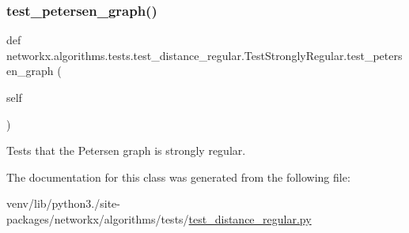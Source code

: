 \subsubsection{\texorpdfstring{test\+\_\+petersen\+\_\+graph()}{test\_petersen\_graph()}}
{\footnotesize\ttfamily def networkx.\+algorithms.\+tests.\+test\+\_\+distance\+\_\+regular.\+Test\+Strongly\+Regular.\+test\+\_\+petersen\+\_\+graph (\begin{DoxyParamCaption}\item[{}]{self }\end{DoxyParamCaption})}

\begin{DoxyVerb}Tests that the Petersen graph is strongly regular.\end{DoxyVerb}
 

The documentation for this class was generated from the following file\+:\begin{DoxyCompactItemize}
\item 
venv/lib/python3./site-\/packages/networkx/algorithms/tests/\hyperlink{test__distance__regular_8py}{test\+\_\+distance\+\_\+regular.\+py}\end{DoxyCompactItemize}
